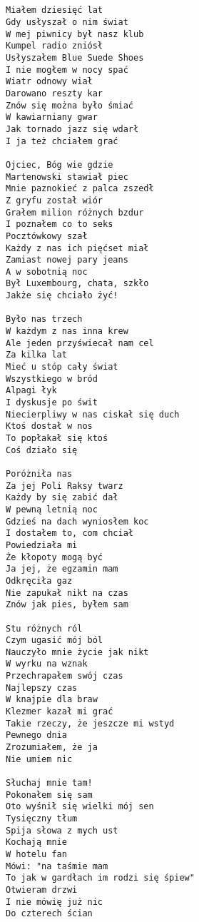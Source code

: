 \documentclass[12pt]{article}
\begin{document}
\subsection*{}
\begin{verbatim}
Miałem dziesięć lat
Gdy usłyszał o nim świat
W mej piwnicy był nasz klub
Kumpel radio zniósł
Usłyszałem Blue Suede Shoes
I nie mogłem w nocy spać
Wiatr odnowy wiał
Darowano reszty kar
Znów się można było śmiać
W kawiarniany gwar
Jak tornado jazz się wdarł
I ja też chciałem grać

Ojciec, Bóg wie gdzie
Martenowski stawiał piec
Mnie paznokieć z palca zszedł
Z gryfu został wiór
Grałem milion różnych bzdur
I poznałem co to seks
Pocztówkowy szał
Każdy z nas ich pięćset miał
Zamiast nowej pary jeans
A w sobotnią noc
Był Luxembourg, chata, szkło
Jakże się chciało żyć!

Było nas trzech
W każdym z nas inna krew
Ale jeden przyświecał nam cel
Za kilka lat
Mieć u stóp cały świat
Wszystkiego w bród
Alpagi łyk
I dyskusje po świt
Niecierpliwy w nas ciskał się duch
Ktoś dostał w nos
To popłakał się ktoś
Coś działo się

Poróżniła nas
Za jej Poli Raksy twarz
Każdy by się zabić dał
W pewną letnią noc
Gdzieś na dach wyniosłem koc
I dostałem to, com chciał
Powiedziała mi
Że kłopoty mogą być
Ja jej, że egzamin mam
Odkręciła gaz
Nie zapukał nikt na czas
Znów jak pies, byłem sam

Stu różnych ról
Czym ugasić mój ból
Nauczyło mnie życie jak nikt
W wyrku na wznak
Przechrapałem swój czas
Najlepszy czas
W knajpie dla braw
Klezmer kazał mi grać
Takie rzeczy, że jeszcze mi wstyd
Pewnego dnia
Zrozumiałem, że ja
Nie umiem nic

Słuchaj mnie tam!
Pokonałem się sam
Oto wyśnił się wielki mój sen
Tysięczny tłum
Spija słowa z mych ust
Kochają mnie
W hotelu fan
Mówi: "na taśmie mam
To jak w gardłach im rodzi się śpiew"
Otwieram drzwi
I nie mówię już nic
Do czterech ścian
\end{verbatim}
\clearpage
\end{document}
